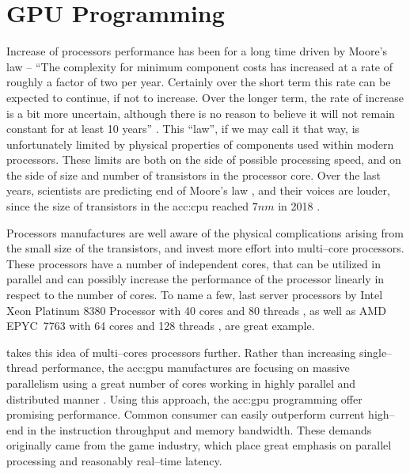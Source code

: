 \chapter{GPU Programming}

Increase of processors performance has been for a long time driven by Moore's law -- \enquote{The complexity for minimum component costs has increased at a rate of roughly a factor of two per year. Certainly over the short term this rate can be expected to continue, if not to increase. Over the longer term, the rate of increase is a bit more uncertain, although there is no reason to believe it will not remain constant for at least 10 years} \citep{MooresLaw}. This \enquote{law}, if we may call it that way, is unfortunately limited by physical properties of components used within modern processors. These limits are both on the side of possible processing speed, and on the side of size and number of transistors in the processor core. Over the last years, scientists are predicting end of Moore's law \citep{MooresLawEnd}, and their voices are louder, since the size of transistors in the \acrfull{acc:cpu} reached $7nm$ in 2018 \citep{SamsungSevenNm}. 

Processors manufactures are well aware of the physical complications arising from the small size of the transistors, and invest more effort into multi--core processors. These processors have a number of independent cores, that can be utilized in parallel and can possibly increase the performance of the processor linearly in respect to the number of cores. To name a few, last server processors by Intel\textsuperscript{\textregistered} Xeon\textsuperscript{\textregistered} Platinum 8380 Processor with 40 cores and 80 threads \citep{IntelXeonPlatinum}, as well as AMD EPYC\texttrademark\ 7763 with 64 cores and 128 threads \citep{AMDEpyc}, are great example.

 takes this idea of multi--cores processors further. Rather than increasing single--thread performance, the \acrshort{acc:gpu} manufactures are focusing on massive parallelism using a great number of cores working in highly parallel and distributed manner \citep{GPUComputingOwens}. Using this approach, the \acrshort{acc:gpu} programming offer promising performance. Common consumer  can easily outperform current high--end  in the instruction throughput and memory bandwidth. These demands originally came from the game industry, which place great emphasis on parallel processing and reasonably real--time latency. 

